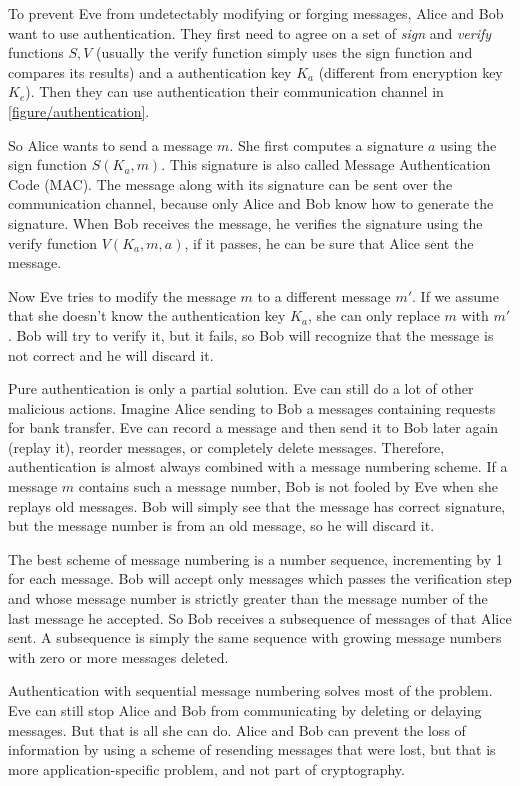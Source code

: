 To prevent Eve from undetectably modifying or forging messages, Alice and Bob want to use authentication. They first need to agree on a set of \textit{sign} and \textit{verify} functions $S, V$ (usually the verify function simply uses the sign function and compares its results) and a authentication key $K_a$ (different from encryption key $K_e$). Then they can use authentication their communication channel in \autoref{figure/authentication}.

So Alice wants to send a message $m$. She first computes a signature $a$ using the sign function $S(K_a, m)$. This signature is also called Message Authentication Code (MAC). The message along with its signature can be sent over the communication channel, because only Alice and Bob know how to generate the signature. When Bob receives the message, he verifies the signature using the verify function $V(K_a, m, a)$, if it passes, he can be sure that Alice sent the message.

Now Eve tries to modify the message $m$ to a different message $m'$. If we assume that she doesn't know the authentication key $K_a$, she can only replace $m$ with $m'$. Bob will try to verify it, but it fails, so Bob will recognize that the message is not correct and he will discard it.

Pure authentication is only a partial solution. Eve can still do a lot of other malicious actions. Imagine Alice sending to Bob a messages containing requests for bank transfer. Eve can record a message and then send it to Bob later again (replay it), reorder messages, or completely delete messages. Therefore, authentication is almost always combined with a message numbering scheme. If a message $m$ contains such a message number, Bob is not fooled by Eve when she replays old messages. Bob will simply see that the message has correct signature, but the message number is from an old message, so he will discard it.

The best scheme of message numbering is a number sequence, incrementing by 1 for each message. Bob will accept only messages which passes the verification step and whose message number is strictly greater than the message number of the last message he accepted. So Bob receives a subsequence of messages of that Alice sent. A subsequence is simply the same sequence with growing message numbers with zero or more messages deleted.

Authentication with sequential message numbering solves most of the problem. Eve can still stop Alice and Bob from communicating by deleting or delaying messages. But that is all she can do. Alice and Bob can prevent the loss of information by using a scheme of resending messages that were lost, but that is more application-specific problem, and not part of cryptography.

